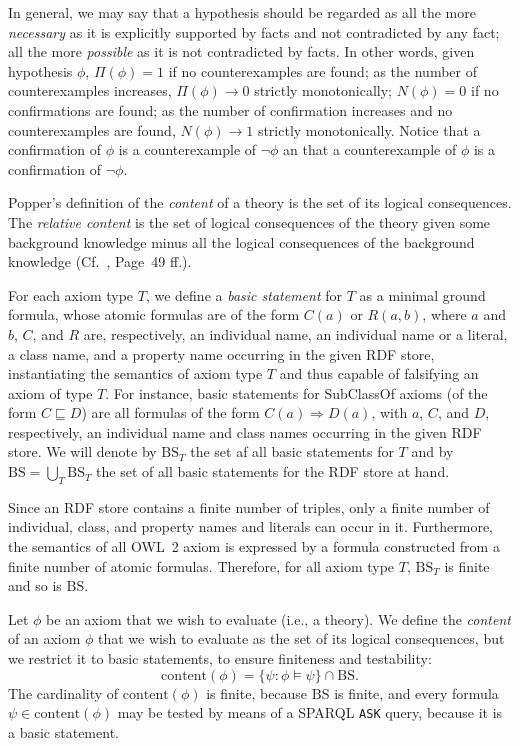\documentclass[a4paper]{article}
\newcounter{ex}
\begin{document}
In general, we may say that a hypothesis should be regarded as all the more
\emph{necessary} as it is explicitly supported by facts and not contradicted by any fact;
all the more \emph{possible} as it is not contradicted by facts.
In other words, given hypothesis $\phi$, $\Pi(\phi) = 1$ if no counterexamples are found;
as the number of counterexamples increases, $\Pi(\phi) \to 0$ strictly monotonically;
$N(\phi) = 0$ if no confirmations are found; as the number of confirmation increases
and no counterexamples are found, $N(\phi) \to 1$ strictly monotonically.
Notice that a confirmation of $\phi$ is a counterexample of $\neg\phi$
an that a counterexample of $\phi$ is a confirmation of $\neg\phi$.

Popper's definition of the \emph{content} of a theory is the set of its logical consequences.
The \emph{relative content} is the set of logical consequences of the theory
given some background knowledge minus all the logical consequences of the
background knowledge (Cf.~\cite{Popper1972}, Page~49 ff.).

For each axiom type $T$, we define a \emph{basic statement} for $T$ as a minimal
ground formula, whose atomic formulas are of the form $C(a)$ or $R(a, b)$,
where $a$ and $b$, $C$, and $R$ are, respectively, an individual name,
an individual name or a literal, a class name,
and a property name occurring in the given RDF store, instantiating the semantics
of axiom type $T$ and thus capable of falsifying an axiom of type $T$.
For instance, basic statements for \textsf{SubClassOf} axioms (of the form $C \sqsubseteq D$)
are all formulas of the form $C(a) \Rightarrow D(a)$, with $a$, $C$, and $D$,
respectively, an individual name and class names occurring in the given RDF store.
We will denote by $\mathrm{BS}_T$ the set af all basic statements for $T$
and by $\mathrm{BS} = \bigcup_T \mathrm{BS}_T$ the set of all basic statements
for the RDF store at hand.

Since an RDF store contains a finite number of triples, only a finite number of
individual, class, and property names and literals can occur in it. Furthermore, the semantics
of all OWL~2 axiom is expressed by a formula constructed from a finite number of
atomic formulas. Therefore, for all axiom type $T$, $\mathrm{BS}_T$ is finite
and so is $\mathrm{BS}$.

Let $\phi$ be an axiom that we wish to evaluate (i.e., a theory).
We define the \emph{content} of an axiom $\phi$ that we wish to evaluate
as the set of its logical consequences, but we restrict it to basic statements, 
to ensure finiteness and testability:
\begin{equation}\label{eq:content}
  \mathrm{content}(\phi) = \{\psi : \phi \models \psi\} \cap \mathrm{BS}.
\end{equation}
The cardinality of $\mathrm{content}(\phi)$ is finite, because $\mathrm{BS}$ is finite,
and every formula $\psi \in \mathrm{content}(\phi)$ may be tested by means of a
SPARQL \texttt{ASK} query, because it is a basic statement.
\end{document}
